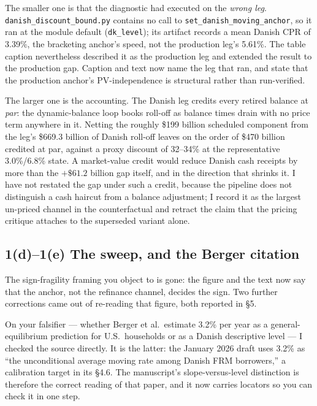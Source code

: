 \documentclass[11pt]{article}
\begin{document}
The smaller one is that the diagnostic had executed on the \emph{wrong leg}.
\texttt{danish\_discount\_bound.py} contains no call to
\texttt{set\_danish\_moving\_anchor}, so it ran at the module default
(\texttt{dk\_level}); its artifact records a mean Danish CPR of 3.39\%, the
bracketing anchor's speed, not the production leg's 5.61\%. The table caption
nevertheless described it as the production leg and extended the result to the
production gap. Caption and text now name the leg that ran, and state that the
production anchor's PV-independence is structural rather than run-verified.

The larger one is the accounting. The Danish leg credits every retired balance at
\emph{par}: the dynamic-balance loop books roll-off as balance times drain with
no price term anywhere in it. Netting the roughly \$199 billion scheduled
component from the leg's \$669.3 billion of Danish roll-off leaves on the order
of \$470 billion credited at par, against a proxy discount of 32--34\% at the
representative 3.0\%/6.8\% state. A market-value credit would reduce Danish cash
receipts by more than the $+\$61.2$ billion gap itself, and in the direction that
shrinks it. I have not restated the gap under such a credit, because the pipeline
does not distinguish a cash haircut from a balance adjustment; I record it as the
largest un-priced channel in the counterfactual and retract the claim that the
pricing critique attaches to the superseded variant alone.

\subsection{1(d)--1(e) The sweep, and the Berger citation}

The sign-fragility framing you object to is gone: the figure and the text now say
that the anchor, not the refinance channel, decides the sign. Two further
corrections came out of re-reading that figure, both reported in \S5.

On your falsifier --- whether Berger et al.\ estimate 3.2\% per year as a
general-equilibrium prediction for U.S.\ households or as a Danish descriptive
level --- I checked the source directly. It is the latter: the January 2026 draft
uses 3.2\% as ``the unconditional average moving rate among Danish FRM
borrowers,'' a calibration target in its \S4.6. The manuscript's slope-versus-level
distinction is therefore the correct reading of that paper, and it now carries
locators so you can check it in one step.
\end{document}
